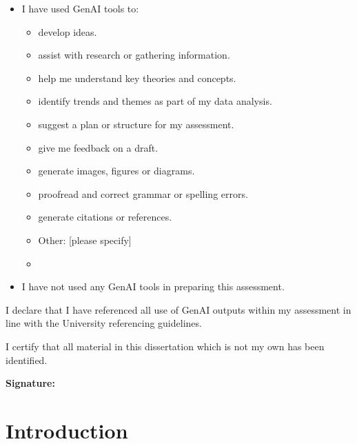 \documentclass[11pt,a4paper]{article}
\begin{document}
\begin{itemize}[label={\ $\square$\ }, leftmargin=*]
  \item I have used GenAI tools to:
  \begin{itemize}[label={\ $\square$\ }, leftmargin=*]
    \item develop ideas.
    \item assist with research or gathering information.
    \item help me understand key theories and concepts.
    \item identify trends and themes as part of my data analysis.
    \item suggest a plan or structure for my assessment.
    \item give me feedback on a draft.
    \item generate images, figures or diagrams.
    \item proofread and correct grammar or spelling errors.
    \item generate citations or references.
    \item Other: [please specify]
    \item[]
  \end{itemize}
  \item I have not used any GenAI tools in preparing this assessment.
\end{itemize}

\bigskip
I declare that I have referenced all use of GenAI outputs within my assessment in line with the University referencing guidelines.

\vspace{1em}
I certify that all material in this dissertation which is not my own has been identified. 

\vspace{5em}
{\bf\noindent Signature:} \hrulefill
\newpage

\tableofcontents 
\thispagestyle{empty} 
\newpage 

\clearpage
{} 

%
%
\section{Introduction}
\end{document}
